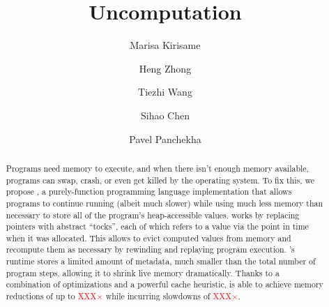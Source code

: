 \documentclass[acmsmall]{acmart}
\newcommand\todo[1]{\textcolor{red}{#1}}
\begin{document}
\title{Uncomputation}

\author{Marisa Kirisame}
\authornotemark[1]

\author{Heng Zhong}

\author{Tiezhi Wang}

\author{Sihao Chen}

\author{Pavel Panchekha}
\email{}
\authornotemark[1]

\renewcommand{\shortauthors}{Kirisame et al.}

\begin{abstract}
  Programs need memory to execute,
    and when there isn't enough memory available,
    programs can swap, crash, or even get killed by the operating system.
  To fix this, we propose \name,
    a purely-function programming language implementation
    that allows programs to continue running
    (albeit much slower)
    while using much less memory than necessary
    to store all of the program's heap-accessible values.
  \name works by replacing pointers with abstract ``tocks'',
    each of which refers to a value via the point in time
    when it was allocated.
  This allows \name to evict computed values from memory
    and recompute them as necessary
    by rewinding and replaying program execution.
  \name's runtime stores a limited amount of metadata,
    much smaller than the total number of program steps,
    allowing it to shrink live memory dramatically.
  Thanks to a combination of optimizations
    and a powerful cache heuristic,
    \name is able to achieve memory reductions
    of up to \todo{XXX$\times$}
    while incurring slowdowns of \todo{XXX$\times$}.
\end{abstract}
\end{document}
